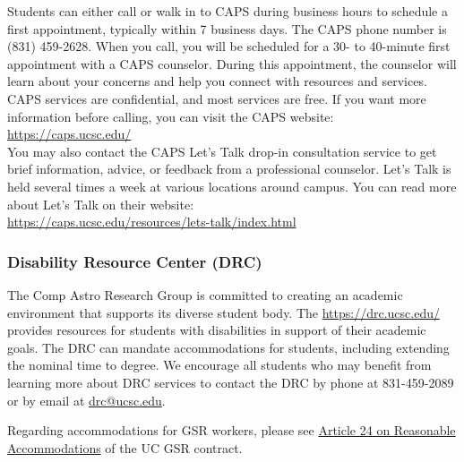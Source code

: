 \noindent
Students can either call or walk in to CAPS during business hours to schedule a first appointment, typically within 7 business days. The CAPS phone number is (831) 459-2628. When you call, you will be scheduled for a 30- to 40-minute first appointment with a CAPS counselor. During this appointment, the counselor will learn about your concerns and help you connect with resources and services. CAPS services are confidential, and most services are free. If you want more information before calling, you can visit the CAPS website: \\

\noindent
\href{https://caps.ucsc.edu/}{https://caps.ucsc.edu/}\\

\noindent
You may also contact the CAPS Let’s Talk drop-in consultation service to get brief information, advice, or feedback from a professional counselor. Let’s Talk is held several times a week at various locations around campus. You can read more about Let’s Talk on their website: \\

\noindent
\href{https://caps.ucsc.edu/resources/lets-talk/index.html}{https://caps.ucsc.edu/resources/lets-talk/index.html}\\

\subsubsection{Disability Resource Center (DRC)}

The Comp Astro Research Group is committed to creating an academic environment that supports its diverse
student body.  The \href{UCSC Disability Resource Center (DRC)}{https://drc.ucsc.edu/} provides resources for students with disabilities in support of their academic goals. The DRC can mandate accommodations for students, including extending the nominal time to degree. 
We encourage all students who may benefit from learning more about DRC services to contact the DRC by
phone at 831-459-2089 or by email at \href{mailto:drc@ucsc.edu}{drc@ucsc.edu}.

Regarding accommodations for GSR workers, please see \href{https://ucnet.universityofcalifornia.edu/wp-content/uploads/labor/bargaining-units/br/docs/br_24_reasonable-accommodation_2022-2025.pdf}{Article 24 on Reasonable Accommodations} of the UC GSR contract.
